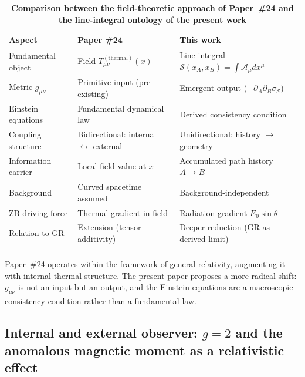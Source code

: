 \documentclass[%
 reprint, amsmath,amssymb, aps, prb, ]{revtex4-2}
\numberwithin{equation}{section}
\newcommand{\iphase}{\theta}  %
\begin{document}
\begin{table}[t!]
\centering
\caption{\textbf{Comparison between the field-theoretic approach of Paper~\#24 and the line-integral ontology of the present work}}
\label{tab:ontology_comparison}
\renewcommand{\arraystretch}{1.4}
\begin{tabular}{p{4.5cm}p{6.5cm}p{6.5cm}}
\toprule
\textbf{Aspect} & \textbf{Paper \#24 \cite{hanamura24}} & \textbf{This work} \\
\midrule
Fundamental object
& Field $T_{\mu\nu}^{(\text{thermal})}(x)$
& Line integral $\mathcal{S}(x_A,x_B) = \int \mathcal{A}_\mu dx^\mu$ \\
\addlinespace[0.3cm]
Metric $g_{\mu\nu}$
& Primitive input (pre-existing)
& Emergent output ($-\partial_A\partial_B\sigma_{\mathcal{S}}$) \\
\addlinespace[0.3cm]
Einstein equations
& Fundamental dynamical law
& Derived consistency condition \\
\addlinespace[0.3cm]
Coupling structure
& Bidirectional: internal $\leftrightarrow$ external
& Unidirectional: history $\to$ geometry \\
\addlinespace[0.3cm]
Information carrier
& Local field value at $x$
& Accumulated path history $A\to B$ \\
\addlinespace[0.3cm]
Background
& Curved spacetime assumed
& Background-independent \\
\addlinespace[0.3cm]
ZB driving force
& Thermal gradient in field
& Radiation gradient $E_0\sin\iphase$ \\
\addlinespace[0.3cm]
Relation to GR
& Extension (tensor additivity)
& Deeper reduction (GR as derived limit) \\
\addlinespace[0.2cm]
\bottomrule
\end{tabular}
\vspace{0.2cm}
\begin{minipage}{0.95\textwidth}
\justifying\footnotesize
Paper~\#24 operates within the framework of general relativity, augmenting it with internal thermal structure. The present paper proposes a more radical shift: $g_{\mu\nu}$ is not an input but an output, and the Einstein equations are a macroscopic consistency condition rather than a fundamental law.
\end{minipage}
\end{table}

\subsection{Internal and external observer: $g=2$ and the anomalous magnetic moment as a relativistic effect}
\label{subsec:gfactor_observers}
\end{document}
